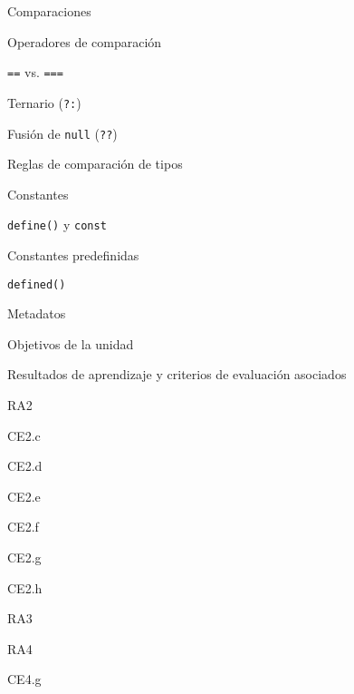 \begin{longenum}
\begin{longenum}
\begin{longenum}
            \item Comparaciones
            \begin{longenum}
                \item Operadores de comparación
                \item \texttt{==} vs. \texttt{===}
                \item Ternario (\texttt{?:})
                \item Fusión de \texttt{null} (\texttt{??})
                \item Reglas de comparación de tipos
            \end{longenum}
        \end{longenum}
        \item Constantes
        \begin{longenum}
            \item \texttt{define()} y \texttt{const}
            \item Constantes predefinidas
            \item \texttt{defined()}
        \end{longenum}
        \item Metadatos
        \begin{longenum}
            \item Objetivos de la unidad
            \item Resultados de aprendizaje y criterios de evaluación asociados
            \begin{longenum}
                \item RA2
                \begin{longenum}
                    \item CE2.c
                    \item CE2.d
                    \item CE2.e
                    \item CE2.f
                    \item CE2.g
                    \item CE2.h
                \end{longenum}
                \item RA3
                \item RA4
                \begin{longenum}
                    \item CE4.g
                \end{longenum}
            \end{longenum}

\end{longenum}
\end{longenum}
\end{longenum}
